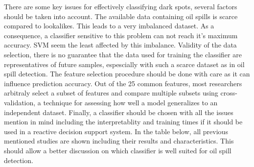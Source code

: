 There are some key issues for effectively classifying dark spots, several factors should be taken into account\cite{Kubat:1998:MLD:288808.288812}. The available data containing oil spills is scarce compared to lookalikes. This leads to a very imbalanced dataset. As a consequence, a classifier sensitive to this problem can not reach it's maximum accuracy\cite{Japkowicz20026}. SVM seem the least affected by this imbalance. Validity of the data selection, there is no guarantee that the data used for training the classifier are representatives of future samples, espescially with such a scarce dataset as in oil spill detection. The feature selection procedure should be done with care as it can influence prediction accuracy. Out of the 25 common features, most researchers arbitraly select a subset of features and compare multiple subsets using cross-validation, a technique for assessing how well a model generalizes to an independent dataset. Finally, a classifier should be chosen with all the issues mention in mind including the interpretablity and training times if it should be used in a reactive decision support system. In the table below, all previous mentioned studies are shown including their results and characteristics. This should allow a better discussion on which classifier is well suited for oil spill detection.

